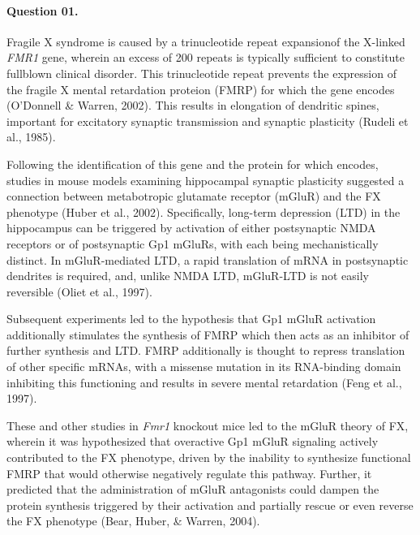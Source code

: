 \documentclass[11pt,letterpaper,final] {article}
\begin{document}

\paragraph{Question 01.} Fragile X syndrome is caused by a trinucleotide repeat expansionof the X-linked \textit{FMR1} gene, wherein an excess of 200 repeats is typically sufficient to constitute fullblown clinical disorder. This trinucleotide repeat prevents the expression of the fragile X mental retardation proteion (FMRP) for which the gene encodes (O'Donnell \& Warren, 2002). This results in elongation of dendritic spines, important for excitatory synaptic transmission and synaptic plasticity (Rudeli et al., 1985).

Following the identification of this gene and the protein for which encodes, studies in mouse models examining hippocampal synaptic plasticity suggested a connection between metabotropic glutamate receptor (mGluR) and the FX phenotype (Huber et al., 2002). Specifically, long-term depression (LTD) in the hippocampus can be triggered by activation of either postsynaptic NMDA receptors or of postsynaptic Gp1 mGluRs, with each being mechanistically distinct. In mGluR-mediated LTD, a rapid translation of mRNA in postsynaptic dendrites is required, and, unlike NMDA LTD, mGluR-LTD is not easily reversible (Oliet et al., 1997).

Subsequent experiments led to the hypothesis that Gp1 mGluR activation additionally stimulates the synthesis of FMRP which then acts as an inhibitor of further synthesis and LTD. FMRP additionally is thought to repress translation of other specific mRNAs, with a missense mutation in its RNA-binding domain inhibiting this functioning and results in severe mental retardation (Feng et al., 1997).

These and other studies in \textit{Fmr1} knockout mice led to the mGluR theory of FX, wherein it was hypothesized that overactive Gp1 mGluR signaling actively contributed to the FX phenotype, driven by the inability to synthesize functional FMRP that would otherwise negatively regulate this pathway. Further, it predicted that the administration of mGluR antagonists could dampen the protein synthesis triggered by their activation and partially rescue or even reverse the FX phenotype (Bear, Huber, \& Warren, 2004).
\end{document}
